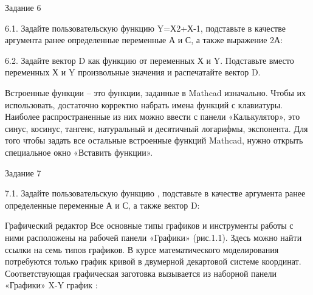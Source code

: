 Задание 6

6.1. Задайте пользовательскую функцию Y=Х2+Х-1, подставьте в качестве аргумента ранее определенные переменные А и С, а также выражение 2А:


6.2. Задайте вектор D как функцию от переменных Х и Y. Подставьте вместо переменных Х и Y произвольные значения и распечатайте вектор D.



Встроенные функции – это функции, заданные в Mathcad изначально. Чтобы их использовать, достаточно корректно набрать имена функций с клавиатуры. Наиболее распространенные из них можно ввести с панели «Калькулятор», это синус, косинус, тангенс, натуральный и десятичный логарифмы, экспонента. Для того чтобы задать все остальные встроенные функций Mathcad, нужно открыть специальное окно «Вставить функции».

Задание 7

7.1. Задайте пользовательскую функцию , 
подставьте в качестве аргумента ранее определенные переменные А и С, а также вектор D:


Графический редактор
Все основные типы графиков и инструменты работы с ними расположены на рабочей панели «Графики» (рис.1.1). Здесь можно найти ссылки на семь типов графиков. В курсе математического моделирования потребуются только график кривой в двумерной декартовой системе координат. Соответствующая графическая заготовка вызывается из наборной панели «Графики»  X-Y график :



